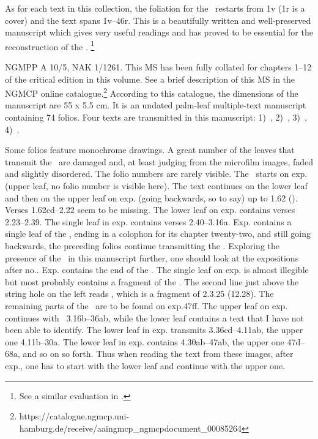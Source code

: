 As for each text in this collection, the foliation for the
\VSS\ restarts from \fol1v (\fol1r is a cover) and the text
spans \fols1v--46r. This is a beautifully written and well-preserved
manuscript which gives very useful readings and has proved to be
essential for the reconstruction of the \Vss.%
	\footnote{See a similar evaluation in
					.}


NGMPP A 10/5, NAK 1/1261. This MS has been fully collated 
for chapters 1--12 of the critical edition in this volume. 
See a brief description of this MS in
the NGMCP online catalogue.\footnote{https://catalogue.ngmcp.uni-hamburg.de/receive/aaingmcp\_ngmcpdocument\_00085264}
According to this catalogue, the dimensions of the manuscript are 55 x
5.5 cm. It is an undated palm-leaf multiple-text manuscript containing 74
folios. Four texts are transmitted in this manuscript: 
1)~\SDhU,
2)~\Ums,
3)~\SivaUp,
4)~\Vss.

Some folios feature monochrome drawings. 
A great number of the leaves that 
transmit the \VSS\ are damaged and, 
at least judging from the microfilm images, 
faded and slightly disordered. The folio numbers are
rarely visible. The \VSS\ starts on exp. 
(upper leaf, no folio number is visible here). 
The text continues on the lower leaf and then on the upper
leaf on exp. (going backwards, so to say) 
up to 1.62 (). 
Verses 1.62cd--2.22 seem to be missing. The lower leaf on
exp. contains verses 2.23--2.39. 
The single leaf in exp. contains
verses 2.40--3.16a. Exp. contains a single leaf of the
, ending in a colophon for its chapter
twenty-two, and still going backwards, the preceding folios continue
transmitting the 
. 
Exploring the presence of
the \VSS\ in this manuscript further, 
one should look at the expositions
after no.. Exp. contains the end of the
. The
single leaf on exp. 
is almost illegible but most probably contains a
fragment of the 
. 
The second line just above
the string hole on the left reads  , which is a fragment of
 2.3.25 (12.28). 
The remaining parts of the \VSS\
are to be found on exp.ff. 
The upper leaf on exp.\thinspace47 continues with
\VSS\ 3.16b--36ab, while the lower leaf contains a text that I have not
been able to identify. The lower leaf in exp.\thinspace48 transmits
3.36cd--4.11ab, the upper one 4.11b--30a. The lower leaf in 
exp. contains 4.30ab--47ab, 
the upper one 47d--68a, and so on so forth. Thus
when reading the text from these images, after exp., 
one has to start with the lower leaf and continue with the upper one.


